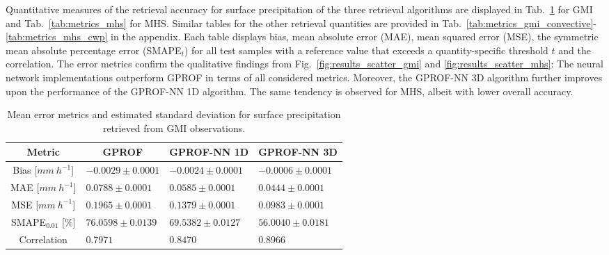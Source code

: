 \documentclass[journal abbreviation, manuscript]{copernicus}
\begin{document}
Quantitative measures of the retrieval accuracy for surface precipitation of the
three retrieval algorithms are displayed in Tab.~\ref{tab:metrics_gmi} for GMI
and Tab.~\ref{tab:metrics_mhs} for MHS. Similar tables for the other retrieval
quantities are provided in
Tab.~\ref{tab:metrics_gmi_convective}-\ref{tab:metrics_mhs_cwp} in the appendix.
Each table displays bias, mean absolute error (MAE), mean squared error (MSE),
the symmetric mean absolute percentage error (SMAPE$_{t}$) for all test samples
with a reference value that exceeds a quantity-specific threshold $t$ and the
correlation. The error metrics confirm the qualitative findings from
Fig.~\ref{fig:results_scatter_gmi} and \ref{fig:results_scatter_mhs}: The neural
network implementations outperform GPROF in terms of all considered metrics.
Moreover, the GPROF-NN 3D algorithm further improves upon the performance of the
GPROF-NN 1D algorithm. The same tendency is observed for MHS, albeit with lower
overall accuracy.

\begin{table}[hbpt!]
  \caption{Mean error metrics and estimated standard deviation for surface
    precipitation retrieved from GMI observations.}
  \label{tab:metrics_gmi}
  \begin{tabular}{|c||p{3.5cm}|p{3.5cm}|p{3.5cm}|}
    \hline
    Metric &
    \multicolumn{1}{|c}{GPROF} &
    \multicolumn{1}{|c}{GPROF-NN 1D} &
    \multicolumn{1}{|c|}{GPROF-NN 3D} \\
    \hline\hline
    Bias \hfill [$\unit{mm\ h^{-1}}$] & \hfill $ -0.0029 \pm 0.0001$ &\hfill $ -0.0024 \pm 0.0001$   &\hfill $ -0.0006 \pm 0.0001$ \\
    MAE \hfill [$\unit{mm\ h^{-1}}$] & \hfill $  0.0788 \pm 0.0001$ &\hfill $  0.0585 \pm 0.0001$    &\hfill $  0.0444 \pm 0.0001$ \\
    MSE \hfill [$\unit{mm\ h^{-1}}$] & \hfill $  0.1965 \pm 0.0001$ &\hfill $  0.1379 \pm 0.0001$    &\hfill $  0.0983 \pm 0.0001$ \\
    SMAPE$_{0.01}$ \hfill [$\unit{\%}$] & \hfill $ 76.0598 \pm 0.0139$ &\hfill $ 69.5382 \pm 0.0127$ &\hfill $ 56.0040 \pm 0.0181$ \\
    Correlation & \hfill $ 0.7971$ &\hfill $  0.8470$ &\hfill $ 0.8966$ \\
    \hline
  \end{tabular}

\end{table}
\end{document}
